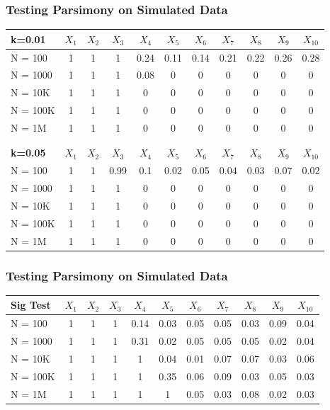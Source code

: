 \documentclass{beamer}
\begin{document}
\begin{frame}[shrink=8]
\center
\frametitle{Testing Parsimony on Simulated Data}

\begin{tabular}{| l | c | c | c | c | c | c | c | c | c | c |}



\hline
\textbf{k=0.01}&	$X_1$&	$X_2$&	$X_3$&	$X_4$&	$X_5$&	$X_6$&	$X_7$&	$X_8$&	$X_9$&	$X_{10}$\\
\hline
N = 100&			1&	1&	1&	0.24&	0.11&	0.14&	0.21&	0.22&	0.26&	0.28 	\\
N = 1000&			1&	1&	1&	0.08&	0&	0&	0&	0&	0&	0	\\
N = 10K&			1&	1&	1&	0&	0&	0&	0&	0&	0&	0	\\
N = 100K&			1&	1&	1&	0&	0&	0&	0&	0&	0&	0	\\
N = 1M&			1&	1&	1&	0&	0&	0&	0&	0&	0&	0	\\
\hline		

\\
								
									\\		
\hline					
\textbf{k=0.05}&	$X_1$&	$X_2$&	$X_3$&	$X_4$&	$X_5$&	$X_6$&	$X_7$&	$X_8$&	$X_9$&	$X_{10}$\\
\hline
N = 100&			1&	1&	0.99&	0.1&	0.02&	0.05&	0.04&	0.03&	0.07&	0.02	\\
N = 1000&			1&	1&	1&	0&	0&	0&	0&	0&	0&	0	\\
N = 10K&			1&	1&	1&	0&	0&	0&	0&	0&	0&	0	\\
N = 100K&			1&	1&	1&	0&	0&	0&	0&	0&	0&	0	\\
N = 1M&			1&	1&	1&	0&	0&	0&	0&	0&	0&	0	\\
\hline


\end{tabular}


\end{frame}

\begin{frame}[shrink=8]
\center
\frametitle{Testing Parsimony on Simulated Data}
\begin{tabular}{| l | c | c | c | c | c | c | c | c | c | c |}
		
\hline
\textbf{Sig Test}&	$X_1$&	$X_2$&	$X_3$&	$X_4$&	$X_5$&	$X_6$&	$X_7$&	$X_8$&	$X_9$&	$X_{10}$\\
\hline
N = 100&		1&	1&	1&	0.14&	0.03&	0.05&	0.05&	0.03&	0.09&	0.04	\\
N = 1000&		1&	1&	1&	0.31&	0.02&	0.05&	0.05&	0.05&	0.02&	0.04	\\
N = 10K&		1&	1&	1&	1&	0.04&	0.01&	0.07&	0.07&	0.03&	0.06	\\
N = 100K&		1&	1&	1&	1&	0.35&	0.06&	0.09&	0.03&	0.05&	0.03	\\
N = 1M&		1&	1&	1&	1&	1&	0.05&	0.03&	0.08&	0.02&	0.03	\\
\hline
\end{tabular}
\end{frame}
\end{document}
